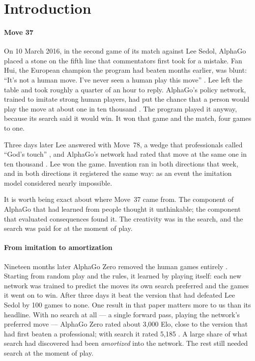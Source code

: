 \section{Introduction}
\label{sec:intro}

\paragraph{Move 37} On 10 March 2016, in the second game of its match against Lee Sedol, AlphaGo
placed a stone on the fifth line that commentators first took for a mistake. Fan Hui, the European
champion the program had beaten months earlier, was blunt: ``It's not a human move. I've never seen
a human play this move'' \citep{metz2016wired}. Lee left the table and took roughly a quarter of an
hour to reply. AlphaGo's policy network, trained to imitate strong human players, had put the chance
that a person would play the move at about one in ten thousand \citep{hassabis2016seoul}. The
program played it anyway, because its search said it would win. It won that game and the match,
four games to one.

Three days later Lee answered with Move~78, a wedge that professionals called ``God's touch''
\citep{koreaherald2016}, and AlphaGo's network had rated that move at the same one in ten thousand
\citep{hassabis2016seoul}. Lee won the game. Invention ran in both directions that week, and in
both directions it registered the same way: as an event the imitation model considered nearly
impossible.

It is worth being exact about where Move~37 came from. The component of AlphaGo that had learned
from people thought it unthinkable; the component that evaluated consequences found it. The
creativity was in the search, and the search was paid for at the moment of play.

\paragraph{From imitation to amortization} Nineteen months later AlphaGo Zero removed the human
games entirely \citep{silver2017zero}. Starting from random play and the rules, it learned by
playing itself: each new network was trained to predict the moves its own search preferred and the
games it went on to win. After three days it beat the version that had defeated Lee Sedol by 100
games to none. One result in that paper matters more to us than its headline. With no search at
all --- a single forward pass, playing the network's preferred move --- AlphaGo Zero rated about
3,000 Elo, close to the version that had first beaten a professional; with search it rated 5,185
\citep{silver2017zero}. A large share of what search had discovered had been \emph{amortized} into
the network. The rest still needed search at the moment of play.

